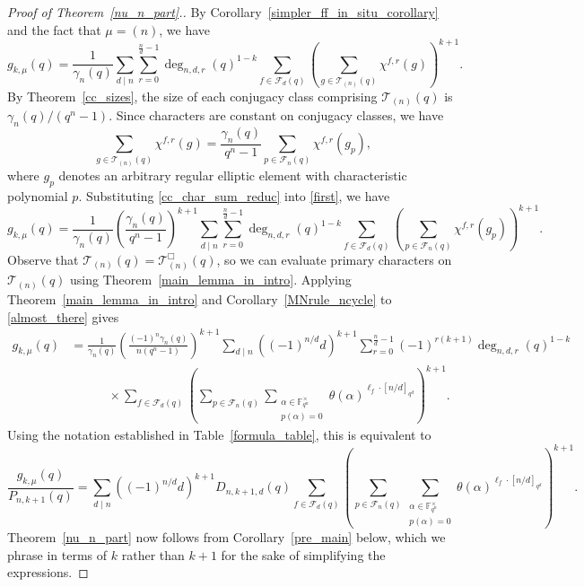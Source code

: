 \documentclass[Unicode,ALCO]{cedram}
\newcommand{\F}{\mathbb{F}}
\newcommand{\CF}{\mathcal{F}}
\newcommand{\CT}{\mathcal{T}}
\newcommand{\te}{\theta}
\begin{document}
\begin{proof}[Proof of Theorem~\ref{nu_n_part}.]
By Corollary~\ref{simpler_ff_in_situ_corollary} and the fact that \(\mu = (n)\), we have
\begin{equation}
\label{first}
g_{k,\mu} (q)
=
\frac{1}{\gamma_n(q)}
\sum_{d \mid n}
\sum_{r=0}^{\tfrac{n}{d}-1}
\deg_{n,d,r}(q)^{1-k}
\sum_{f \in \CF_d (q)}
\left ( \sum_{g \in \CT_{(n)} (q)} \chi^{f,r}(g) \right )^{k+1}.
\end{equation}
By Theorem~\ref{cc_sizes}, the size of each conjugacy class comprising \(\CT_{(n)} (q)\) is \(\gamma_n(q) / (q^n-1)\).
Since characters are constant on conjugacy classes, we have
\begin{equation}
\sum_{g \in \CT_{(n)} (q)}
\chi^{f,r} (g)
=
\frac{\gamma_n(q)}{q^n-1} \sum_{p \in \CF_n (q)} \chi^{f,r}(g_p),
\label{cc_char_sum_reduc}
\end{equation}
where \(g_p\) denotes an arbitrary regular elliptic element with characteristic polynomial \(p\).
Substituting \eqref{cc_char_sum_reduc} into \eqref{first}, we have
\begin{equation}
\label{almost_there}
g_{k,\mu} (q)
=
\frac{1}{\gamma_n(q) }
\left ( \frac{\gamma_n(q)}{q^n-1} \right )^{k+1}
\sum_{d \mid n}
\sum_{r = 0}^{\tfrac{n}{d} - 1} \deg_{n,d,r}(q)^{1-k} \sum_{f \in \CF_d (q)} \left ( \sum_{p \in \CF_n (q)} \chi^{f,r}(g_p) \right )^{k+1}.
\end{equation}
Observe that \(\CT_{(n)} (q) = \CT_{(n)}^\Box (q)\), so we can evaluate primary characters on \(\CT_{(n)} (q)\) using Theorem~\ref{main_lemma_in_intro}.
Applying Theorem~\ref{main_lemma_in_intro} and Corollary~\ref{MNrule_ncycle} to \eqref{almost_there} gives
\begin{align*}
g_{k,\mu} (q)
& =
\frac{1}{\gamma_n(q) }
\left ( \frac{(-1)^n \gamma_n(q)}{n(q^n-1)} \right )^{k+1}
\sum_{d \mid n} ((-1)^{n/d} d)^{k+1}
\sum_{r = 0}^{\tfrac{n}{d} - 1} (-1)^{r(k+1)} \deg_{n,d,r}(q)^{1-k} \\
& \quad \quad \quad \times
\sum_{f \in \CF_d (q)} \left ( \sum_{p \in \CF_n (q)} \sum_{\substack{\alpha \in \F_{q^n}^\times \\ p(\alpha) = 0}}
\te(\alpha)^{\ell_f \cdot [n/d]_{q^d}} \right )^{k+1}.
\end{align*}
Using the notation established in Table~\ref{formula_table}, this is equivalent to
\begin{equation}
\frac{g_{k,\mu} (q)}{P_{n,k+1}(q)}
=
\sum_{d \mid n} ((-1)^{n/d} d)^{k+1}
D_{n,k+1,d}(q)
\sum_{f \in \CF_d (q)} \left ( \sum_{p \in \CF_n (q)} \sum_{\substack{\alpha \in \F_{q^n}^\times \\ p(\alpha) = 0}}
\te(\alpha)^{\ell_f \cdot [n/d]_{q^d}} \right )^{k+1}.
\end{equation}
Theorem~\ref{nu_n_part} now follows from Corollary~\ref{pre_main} below, which we phrase in terms of \(k\) rather than \(k+1\) for the sake of simplifying the expressions.
\end{proof}
\end{document}

